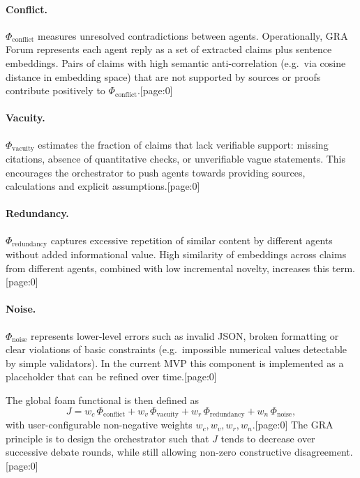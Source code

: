 \documentclass[11pt]{article}
\begin{document}
\paragraph{Conflict.}
\(\Phi_{\text{conflict}}\) measures unresolved contradictions between agents.
Operationally, GRA Forum represents each agent reply as a set of extracted claims plus sentence embeddings.
Pairs of claims with high semantic anti-correlation (e.g.\ via cosine distance in embedding space) that are not supported by sources or proofs contribute positively to \(\Phi_{\text{conflict}}\).[page:0]

\paragraph{Vacuity.}
\(\Phi_{\text{vacuity}}\) estimates the fraction of claims that lack verifiable support: missing citations, absence of quantitative checks, or unverifiable vague statements.
This encourages the orchestrator to push agents towards providing sources, calculations and explicit assumptions.[page:0]

\paragraph{Redundancy.}
\(\Phi_{\text{redundancy}}\) captures excessive repetition of similar content by different agents without added informational value.
High similarity of embeddings across claims from different agents, combined with low incremental novelty, increases this term.[page:0]

\paragraph{Noise.}
\(\Phi_{\text{noise}}\) represents lower-level errors such as invalid JSON, broken formatting or clear violations of basic constraints (e.g.\ impossible numerical values detectable by simple validators).
In the current MVP this component is implemented as a placeholder that can be refined over time.[page:0]

The global foam functional is then defined as
\begin{equation}
  J = w_c \,\Phi_{\text{conflict}} 
    + w_v \,\Phi_{\text{vacuity}}
    + w_r \,\Phi_{\text{redundancy}}
    + w_n \,\Phi_{\text{noise}},
\end{equation}
with user-configurable non-negative weights \(w_c, w_v, w_r, w_n\).[page:0]
The GRA principle is to design the orchestrator such that \(J\) tends to decrease over successive debate rounds, while still allowing non-zero constructive disagreement.[page:0]
\end{document}
